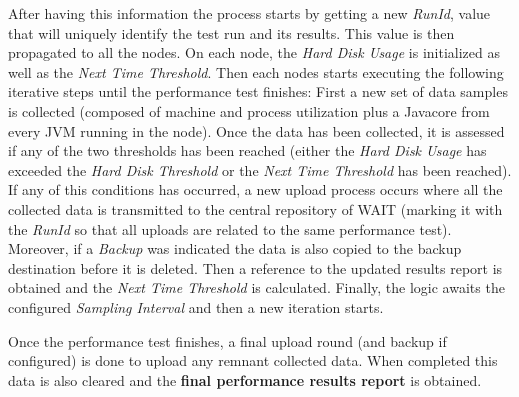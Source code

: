 \documentclass[runningheads,a4paper]{llncs}
\begin{document}
After having this information the process starts by getting a new \emph{RunId},
value that will uniquely identify the test run and its results. This value is
then propagated to all the nodes. On each node, the \emph{Hard Disk Usage} is
initialized as well as the \emph{Next Time Threshold}. Then each nodes starts
executing the following iterative steps until the performance test finishes:
First a new set of data samples is collected (composed of machine and process
utilization plus a Javacore from every JVM running in the node). Once the data 
has been collected, it is assessed if any of the two thresholds has been reached 
(either the \emph{Hard Disk Usage} has exceeded the \emph{Hard Disk
Threshold} or the \emph{Next Time Threshold} has been reached). If any of this
conditions has occurred, a new upload process occurs where all the collected
data is transmitted to the central repository of WAIT (marking it with the
\emph{RunId} so that all uploads are related to the same performance test).
Moreover, if a \emph{Backup} was indicated the data is also copied to the
backup destination before it is deleted. Then a reference to the updated results
report is obtained and the \emph{Next Time Threshold} is calculated. Finally,
the logic awaits the configured \emph{Sampling Interval} and then a new iteration starts.

Once the performance test finishes, a final upload round (and backup if
configured) is done to upload any remnant collected data. When completed this
data is also cleared and the \textbf{final performance results report} is
obtained.
\end{document}
